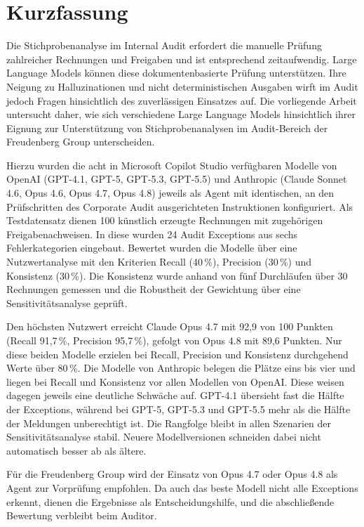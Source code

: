 \documentclass[
    fontsize=12pt,
    BCOR=5mm,
    DIV=12,
    parskip=half,
    paper=a4,
    numbers=noenddot
]{scrreprt}
\begin{document}
\onehalfspacing

\chapter*{Kurzfassung}
\vspace*{-3.072pt}
Die Stichprobenanalyse im Internal Audit erfordert die manuelle Prüfung zahlreicher Rechnungen und Freigaben
und ist entsprechend zeitaufwendig. Large Language Models können diese dokumentenbasierte Prüfung unterstützen.
Ihre Neigung zu Halluzinationen und nicht deterministischen Ausgaben wirft im Audit jedoch Fragen hinsichtlich des zuverlässigen Einsatzes auf.
Die vorliegende Arbeit untersucht daher, wie sich verschiedene Large Language Models hinsichtlich
ihrer Eignung zur Unterstützung von Stichprobenanalysen im Audit-Bereich der Freudenberg Group unterscheiden.

Hierzu wurden die acht in Microsoft Copilot Studio verfügbaren Modelle von OpenAI (GPT-4.1, GPT-5, GPT-5.3, GPT-5.5)
und Anthropic (Claude Sonnet 4.6, Opus 4.6, Opus 4.7, Opus 4.8) jeweils als Agent mit identischen,
an den Prüfschritten des Corporate Audit ausgerichteten Instruktionen konfiguriert. Als Testdatensatz dienen
100 künstlich erzeugte Rechnungen mit zugehörigen Freigabenachweisen. In diese wurden 24 Audit Exceptions aus
sechs Fehlerkategorien eingebaut. Bewertet wurden die Modelle über eine Nutzwertanalyse mit den Kriterien
Recall (40\,\%), Precision (30\,\%) und Konsistenz (30\,\%). Die Konsistenz wurde anhand von fünf Durchläufen
über 30 Rechnungen gemessen und die Robustheit der Gewichtung über eine Sensitivitätsanalyse geprüft.

Den höchsten Nutzwert erreicht Claude Opus 4.7 mit 92,9 von 100 Punkten (Recall 91,7\,\%, Precision 95,7\,\%),
gefolgt von Opus 4.8 mit 89,6 Punkten. Nur diese beiden Modelle erzielen bei Recall, Precision und Konsistenz
durchgehend Werte über 80\,\%. Die Modelle von Anthropic belegen die Plätze eins bis vier und liegen bei Recall
und Konsistenz vor allen Modellen von OpenAI. Diese weisen dagegen jeweils eine deutliche Schwäche auf. GPT-4.1 übersieht
fast die Hälfte der Exceptions, während bei GPT-5, GPT-5.3 und GPT-5.5 mehr als die Hälfte der Meldungen unberechtigt ist.
Die Rangfolge bleibt in allen Szenarien der Sensitivitätsanalyse stabil. Neuere Modellversionen schneiden dabei
nicht automatisch besser ab als ältere.

Für die Freudenberg Group wird der Einsatz von Opus 4.7 oder Opus 4.8 als Agent zur Vorprüfung empfohlen.
Da auch das beste Modell nicht alle Exceptions erkennt, dienen die Ergebnisse als Entscheidungshilfe,
und die abschließende Bewertung verbleibt beim Auditor.
\end{document}
